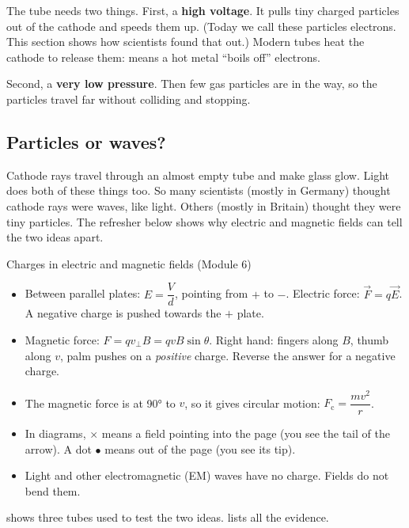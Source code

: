 The tube needs two things. First, a \textbf{high voltage}. It pulls tiny charged
particles out of the cathode and speeds them up. (Today we call these particles
electrons. This section shows how scientists found that out.) Modern tubes heat
the cathode to release them:  means a hot metal
``boils off'' electrons.

Second, a \textbf{very low pressure}. Then few gas particles are in the way, so
the particles travel far without colliding and stopping.

\subsection*{Particles or waves?}
Cathode rays travel through an almost empty tube and make glass glow. Light does
both of these things too. So many scientists (mostly in Germany) thought cathode
rays were waves, like light. Others (mostly in Britain) thought they were tiny
particles. The refresher below shows why electric and magnetic fields can tell
the two ideas apart.

\begin{refresher}{Charges in electric and magnetic fields (Module 6)}
\begin{itemize}
  \item Between parallel plates: $E = \dfrac{V}{d}$, pointing from $+$ to $-$.
        Electric force: $\vec{F} = q\vec{E}$. A negative charge is pushed towards the $+$ plate.
  \item Magnetic force: $F = qv_\perp B = qvB\sin\theta$. Right hand: fingers
        along $B$, thumb along $v$, palm pushes on a \emph{positive} charge.
        Reverse the answer for a negative charge.
  \item The magnetic force is at \ang{90} to $v$, so it gives circular motion:
        $F_\mathrm{c} = \dfrac{mv^2}{r}$.
  \item In diagrams, $\times$ means a field pointing into the page (you see the
        tail of the arrow). A dot $\bullet$ means out of the page (you see its tip).
  \item Light and other electromagnetic (EM) waves have no charge. Fields do not
        bend them.
\end{itemize}
\end{refresher}

 shows three tubes used to test the two ideas.
 lists all the evidence.

